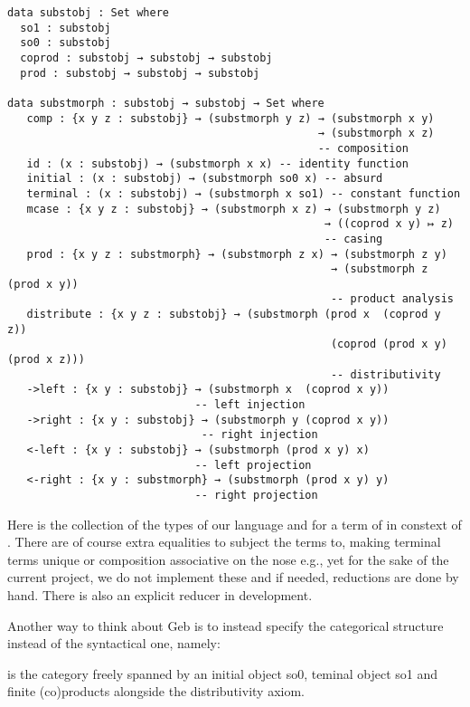 \begin{verbatim}
data substobj : Set where
  so1 : substobj
  so0 : substobj
  coprod : substobj → substobj → substobj
  prod : substobj → substobj → substobj

data substmorph : substobj → substobj → Set where
   comp : {x y z : substobj} → (substmorph y z) → (substmorph x y) 
                                                → (substmorph x z) 
                                                -- composition
   id : (x : substobj) → (substmorph x x) -- identity function
   initial : (x : substobj) → (substmorph so0 x) -- absurd 
   terminal : (x : substobj) → (substmorph x so1) -- constant function
   mcase : {x y z : substobj} → (substmorph x z) → (substmorph y z) 
                                                 → ((coprod x y) ↦ z)
                                                 -- casing 
   prod : {x y z : substmorph} → (substmorph z x) → (substmorph z y) 
                                                  → (substmorph z (prod x y))
                                                  -- product analysis
   distribute : {x y z : substobj} → (substmorph (prod x  (coprod y z)) 
                                                  (coprod (prod x y) (prod x z)))
                                                  -- distributivity
   ->left : {x y : substobj} → (substmorph x  (coprod x y))
                             -- left injection
   ->right : {x y : substobj} → (substmorph y (coprod x y))
                              -- right injection
   <-left : {x y : substobj} → (substmorph (prod x y) x)
                             -- left projection
   <-right : {x y : substmorph} → (substmorph (prod x y) y) 
                             -- right projection
\end{verbatim}

Here \gebobj is the collection of the types of our language and  for a term of  in constext of . There are of course extra equalities to subject the terms to, making terminal terms unique or composition associative on the nose e.g., yet for the sake of the current project, we do not implement these and if needed, reductions are done by hand. There is also an explicit reducer in development.

Another way to think about Geb is to instead specify the categorical structure instead of the syntactical one, namely:
\begin{definition}
 is the category freely spanned by an initial object so0, teminal object so1 and finite (co)products alongside the distributivity axiom.
\end{definition}

